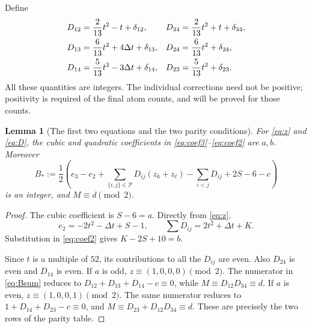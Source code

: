 \documentclass[11pt,a4paper]{article}
\newtheorem{lemma}[theorem]{Lemma}
\theoremstyle{definition}
\newcommand{\pairs}{\mathcal P}
\begin{document}
Define
\begin{align}
 D_{12}&=\frac{2}{13}t^2-t+\delta_{12},
 &D_{34}&=\frac{2}{13}t^2+t+\delta_{34},\notag\\
 D_{13}&=\frac{6}{13}t^2+4\Delta t+\delta_{13},
 &D_{24}&=\frac{6}{13}t^2+\delta_{24},\label{eq:D}\\
 D_{14}&=\frac{5}{13}t^2-3\Delta t+\delta_{14},
 &D_{23}&=\frac{5}{13}t^2+\delta_{23}.\notag
\end{align}
All these quantities are integers. The individual corrections need not be
positive; positivity is required of the final atom counts, and will be
proved for those counts.

\begin{lemma}[The first two equations and the two parity conditions]
\label{lem:parity}
For \eqref{eq:z} and \eqref{eq:D}, the cubic and quadratic coefficients
in \eqref{eq:coef3}--\eqref{eq:coef2} are $a,b$. Moreover
\begin{equation}\label{eq:Bsum}
 B_*:=\frac12\left(e_3-e_2+
 \sum_{\{i,j\}\in\pairs}D_{ij}(z_k+z_\ell)
 -\sum_{i<j}D_{ij}+2S-6-c\right)
\end{equation}
is an integer, and $M\equiv d\pmod2$.
\end{lemma}
\begin{proof}
The cubic coefficient is $S-6=a$. Directly from \eqref{eq:z},
\[
 e_2=-2t^2-\Delta t+S-1,
 \qquad \sum D_{ij}=2t^2+\Delta t+K.
\]
Substitution in \eqref{eq:coef2} gives $K-2S+10=b$.

Since $t$ is a multiple of $52$, its contributions to all the $D_{ij}$
are even. Also $D_{24}$ is even and $D_{14}$ is even. If $a$ is odd,
$z\equiv(1,0,0,0)\pmod2$. The numerator in \eqref{eq:Bsum} reduces to
$D_{12}+D_{13}+D_{14}-c\equiv0$, while
$M\equiv D_{12}D_{34}\equiv d$.
If $a$ is even, $z\equiv(1,0,0,1)\pmod2$. The same numerator reduces
to $1+D_{14}+D_{23}-c\equiv0$, and
$M\equiv D_{23}+D_{12}D_{34}\equiv d$.
These are precisely the two rows of the parity table.
\end{proof}
\end{document}
